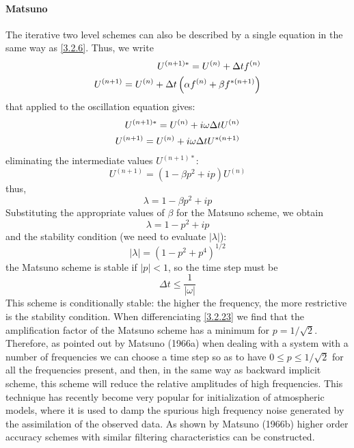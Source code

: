 \paragraph{Matsuno}
The iterative two level schemes can also be described by a single equation in the same way as \ref{3.2.6}. Thus, we write
\begin{align}\label{3.2.18}
	U^{(n+1)*}=U^{(n)}+\Delta tf^{(n)}\notag \\
	U^{(n+1)}=U^{(n)}+\Delta t\left(\alpha f^{(n)}+\beta f^{*(n+1)}\right)
\end{align}
that applied to the oscillation equation gives:
\begin{align}
	U^{(n+1)*}=U^{(n)}+i\omega\Delta tU^{(n)} \notag \\
	U^{(n+1)}=U^{(n)}+i\omega\Delta tU^{*(n+1)}
\end{align}
eliminating the intermediate values $U^{(n+1)*}$:
$$U^{(n+1)}=\left(1-\beta p^2+ip\right)U^{(n)}$$
thus,
\begin{equation}\label{3.2.20}
	\lambda=1-\beta p^2+ip
\end{equation}
Substituting the appropriate values of $\beta$ for the Matsuno scheme, we obtain
\begin{equation}\label{3.2.21}
	\lambda=1-p^2+ip
\end{equation}
and the stability condition (we need to evaluate $|\lambda|$):
\begin{equation}\label{3.2.23}
	|\lambda|=\left(1-p^2+p^4\right)^{1/2}
\end{equation}
the Matsuno scheme is stable if $|p|<1$, so the time step must be $$\Delta t\leq\frac{1}{|\omega|}$$
This scheme is conditionally stable: the higher the frequency, the more restrictive is the stability condition. When differenciating \ref{3.2.23} we find that the amplification factor of the Matsuno scheme has a minimum for $p=1/\sqrt{2}$. Therefore, as pointed out by Matsuno (1966a) when dealing with a system with a number of frequencies we can choose a time step so as to have $0\leq p\leq 1/\sqrt{2}$ for all the frequencies present, and then, in the same way as backward implicit scheme, this scheme will reduce the relative amplitudes of high frequencies. This technique has recently become very popular for initialization of atmospheric models, where it is used to damp the spurious high frequency noise generated by the assimilation of the observed data. As shown by Matsuno (1966b) higher order accuracy schemes with similar filtering characteristics can be constructed.
